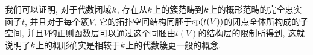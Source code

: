 我们可以证明, 对于代数闭域$\kk$, 存在从$\kk$上的簇范畴到$\kk$上的概形范畴的完全忠实函子$t$, 并且对于每个簇$V$, 它的拓扑空间结构同胚于$\sp (t(V))$的闭点全体所构成的子空间, 并且$V$的正则函数层可以通过这个同胚由$t(V)$的结构层的限制所得到, 这就说明了$\kk$上的概形确实是相较于$\kk$上的代数簇更一般的概念.



